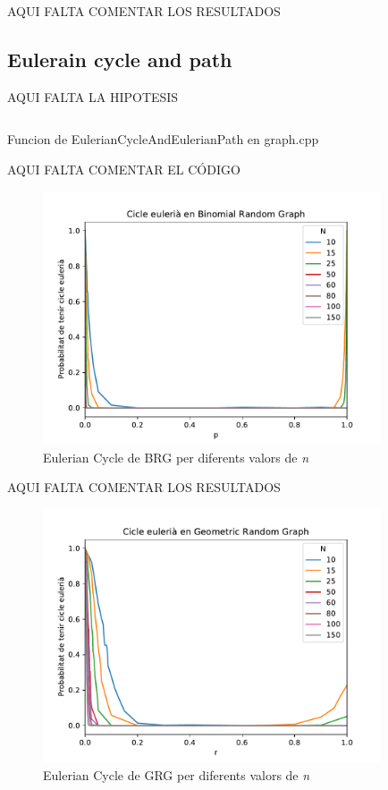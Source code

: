 AQUI FALTA COMENTAR LOS RESULTADOS

\subsection{Eulerain cycle and path}
AQUI FALTA LA HIPOTESIS

\begin{listing}
\inputminted[firstline=71,lastline=97]{cpp}{src/graph.cpp}
\caption{Funcion de EulerianCycleAndEulerianPath en graph.cpp}
\end{listing}

AQUI FALTA COMENTAR EL CÓDIGO

\begin{figure}[H]
    \centering
    \includegraphics[width=10cm]{plots/BRG_eulerianCycle.pdf}
    \caption{Eulerian Cycle de BRG per diferents valors de \textit{n}}
    \label{fig:connect_04}
\end{figure}

AQUI FALTA COMENTAR LOS RESULTADOS

\begin{figure}[H]
    \centering
    \includegraphics[width=10cm]{plots/GRG_eulerianCycle.pdf}
    \caption{Eulerian Cycle de GRG per diferents valors de \textit{n}}
    \label{fig:connect_04}
\end{figure}

